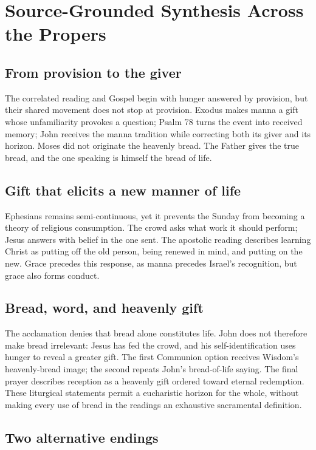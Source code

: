 \section*{Source-Grounded Synthesis Across the Propers}

\subsection*{From provision to the giver}

The correlated reading and Gospel begin with hunger answered by provision,
but their shared movement does not stop at provision. Exodus makes manna a
gift whose unfamiliarity provokes a question; Psalm 78 turns the event into
received memory; John receives the manna tradition while correcting both its
giver and its horizon. Moses did not originate the heavenly bread. The Father
gives the true bread, and the one speaking is himself the bread of life.

\subsection*{Gift that elicits a new manner of life}

Ephesians remains semi-continuous, yet it prevents the Sunday from becoming a
theory of religious consumption. The crowd asks what work it should perform;
Jesus answers with belief in the one sent. The apostolic reading describes
learning Christ as putting off the old person, being renewed in mind, and
putting on the new. Grace precedes this response, as manna precedes Israel's
recognition, but grace also forms conduct.

\subsection*{Bread, word, and heavenly gift}

The acclamation denies that bread alone constitutes life. John does not
therefore make bread irrelevant: Jesus has fed the crowd, and his
self-identification uses hunger to reveal a greater gift. The first Communion
option receives Wisdom's heavenly-bread image; the second repeats John's
bread-of-life saying. The final prayer describes reception as a heavenly gift
ordered toward eternal redemption. These liturgical statements permit a
eucharistic horizon for the whole, without making every use of bread in the
readings an exhaustive sacramental definition.

\subsection*{Two alternative endings}

